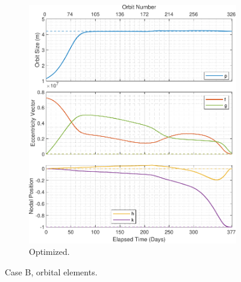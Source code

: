 \begin{figure}[H]
\begin{subfigure}[t]{0.49\textwidth}
        \includegraphics[width=\textwidth]{figures/oguri_optim/orbital_elements.pdf}
        \caption{Optimized.}
        \label{fig:results_optim_b_2}
    \end{subfigure}
    \caption{Case B, orbital elements.}
    \label{fig:results_optim_b}
\end{figure}

